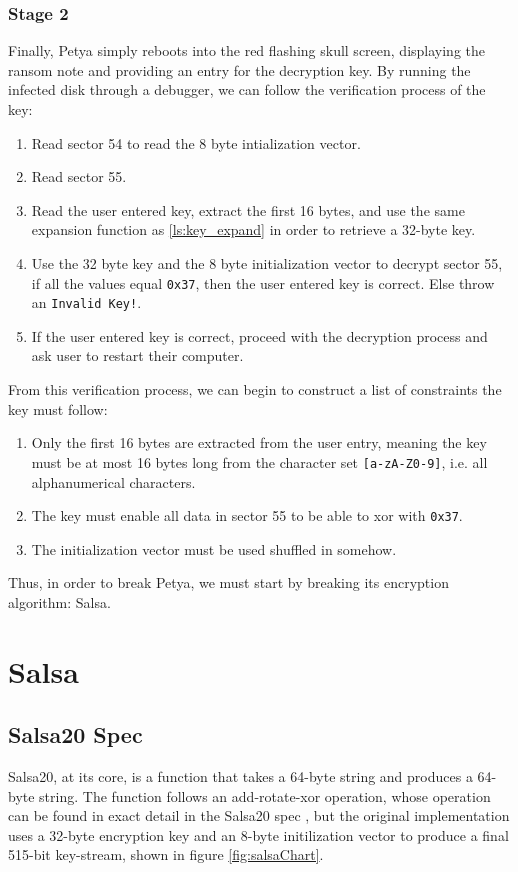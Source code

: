\documentclass[twocolumn]{article}
\newcommand{\code}[1]{\texttt{#1}}
\begin{document}
\subsubsection{Stage 2}
Finally, Petya simply reboots into the red flashing skull screen, displaying the ransom note and providing an entry for the decryption key. By running the infected disk through a debugger, we can follow the verification process of the key:

\begin{enumerate}
	\item Read sector 54 to read the 8 byte intialization vector.
	\item Read sector 55.
	\item Read the user entered key, extract the first 16 bytes, and use the same expansion function as \ref{ls:key_expand} in order to retrieve a 32-byte key.
	\item Use the 32 byte key and the 8 byte initialization vector to decrypt sector 55, if all the values equal \code{0x37}, then the user entered key is correct. Else throw an \code{Invalid Key!}.
	\item If the user entered key is correct, proceed with the decryption process and ask user to restart their computer. 
\end{enumerate}

From this verification process, we can begin to construct a list of constraints the key must follow:

\begin{enumerate}
	\item Only the first 16 bytes are extracted from the user entry, meaning the key must be at most 16 bytes long from the character set \verb|[a-zA-Z0-9]|, i.e. all alphanumerical characters.
	\item The key must enable all data in sector 55 to be able to xor with \code{0x37}.
	\item The initialization vector must be used shuffled in somehow.  
\end{enumerate}

Thus, in order to break Petya, we must start by breaking its encryption algorithm: Salsa.

\section{Salsa}
\label{sec:salsa}
\subsection{Salsa20 Spec}
Salsa20, at its core, is a function that takes a 64-byte string and produces a 64-byte string. The function follows an add-rotate-xor operation, whose operation can be found in exact detail in the Salsa20 spec \cite{salsa20Spec}, but the original implementation uses a 32-byte encryption key and an 8-byte initilization vector to produce a final 515-bit key-stream, shown in figure \ref{fig:salsaChart}. 
\end{document}
